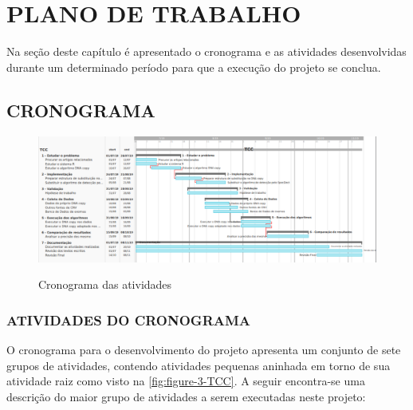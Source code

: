 
\chapter{PLANO DE TRABALHO}
\label{chap:planoDeTrabalho}

Na seção deste capítulo é apresentado o cronograma e as atividades desenvolvidas durante um determinado período para que a execução do projeto se conclua.

\section{CRONOGRAMA}

\begin{figure}[!htb]
    \centering
    \caption{Cronograma das atividades}
    \includegraphics[width=1\textwidth]{./dados/figuras/Figure-3-TCC}
    \label{fig:figure-3-TCC}
\end{figure}

\subsection{ATIVIDADES DO CRONOGRAMA}

O cronograma para o desenvolvimento do projeto apresenta um conjunto de sete grupos de atividades, contendo atividades pequenas aninhada em torno de sua atividade raiz como visto na \autoref{fig:figure-3-TCC}. A seguir encontra-se uma descrição do maior grupo de atividades a serem executadas neste projeto:

